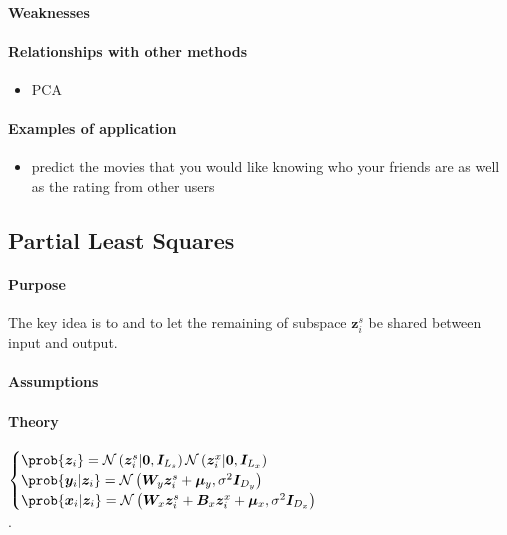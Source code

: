 \paragraph{Weaknesses}
\paragraph{Relationships with other methods}
\begin{itemize}
    \item PCA
\end{itemize}

\paragraph{Examples of application}
\begin{itemize}
    \item predict the movies that you would like knowing who your friends are as well 
        as the rating from other users
\end{itemize}


\subsection{Partial Least Squares}
\paragraph{Purpose}
The key idea is to  and to let the remaining of subspace $\bm{z}_{i}^{
s}$ be shared between input and output.
\paragraph{Assumptions}
\paragraph{Theory}
$\begin{cases}
    \prob{\bm{z}_{i}} = \mathcal{N}\left(\bm{z}^{s}_{i}|\bm{0},\bm{I}_{L_{s}}\right)
    \mathcal{N}\left(\bm{z}^{x}_{i}|\bm{0},\bm{I}_{L_{x}}\right)\\
    \prob{\bm{y}_{i}|\bm{z}_{i}} = \mathcal{N}\left(\bm{W}_{y}\bm{z}^{s}_{i} + 
    \bm{\mu}_{y},\sigma^{2}\bm{I}_{D_{y}}
    \right)\\
        \prob{\bm{x}_{i}|\bm{z}_{i}} = \mathcal{N}\left(\bm{W}_{x}\bm{z}^{s}_{i} + \bm{B}_{x}
        \bm{z}^{x}_{i} + \bm{\mu}_{x},\sigma^{2}\bm{I}_{D_{x}}\right)
\end{cases}$\\
.
